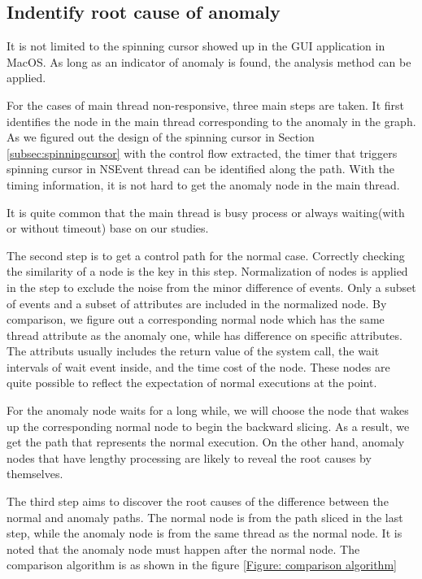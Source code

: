 \subsection{Indentify root cause of anomaly} \label{subsec:rootcause}                                                    
It is not limited to the spinning cursor showed up in the GUI application in MacOS.
As long as an indicator of anomaly is found, the analysis method can be applied.

For the cases of main thread non-responsive, three main steps are taken.
It first identifies the node in the main thread corresponding to the anomaly in the graph.
As we figured out the design of the spinning cursor in Section \ref{subsec:spinningcursor} with the control flow extracted, the timer that triggers spinning cursor in NSEvent thread can be identified along the path.
With the timing information, it is not hard to get the anomaly node in the main thread.

It is quite common that the main thread is busy process or always waiting(with or without timeout) base on our studies.

The second step is to get a control path for the normal case.                                       
Correctly checking the similarity of a node is the key in this step.
Normalization of nodes is applied in the step to exclude the noise from the minor difference of events.
Only a subset of events and a subset of attributes are included in the normalized node. 
By comparison, we figure out a corresponding normal node which has the same thread attribute as the anomaly one, while has difference on specific attributes.
The attributs usually includes the return value of the system call, the wait intervals of wait event inside, and the time cost of the node.
These nodes are quite possible to reflect the expectation of normal executions at the point.

For the anomaly node waits for a long while, we will choose the node that wakes up the corresponding normal node to begin the backward slicing.
As a  result, we get the path that represents the normal execution.
On the other hand, anomaly nodes that have lengthy processing are likely to reveal the root causes by themselves.

The third step aims to discover the root causes of the difference between the normal and anomaly paths. 
The normal node is from the path sliced in the last step, while the anomaly node is from the same thread as the normal node.
It is noted that the anomaly node must happen after the normal node.
The comparison algorithm is as shown in the figure \ref{Figure: comparison algorithm} 

